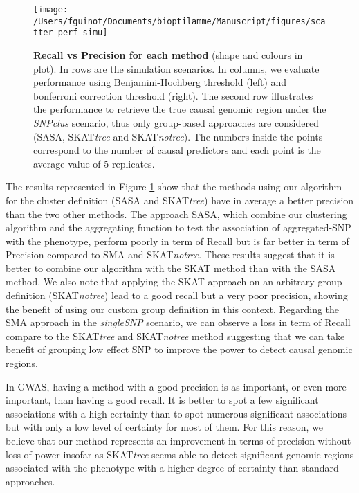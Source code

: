 \documentclass[]{book}
\begin{document}
\begin{figure}

{\centering \texttt{[image: /Users/fguinot/Documents/bioptilamme/Manuscript/figures/scatter\_perf\_simu]} 

}

\caption{\textbf{Recall vs Precision for each method} (shape and colours in plot). In rows are the simulation scenarios. In columns, we evaluate performance using Benjamini-Hochberg threshold (left) and bonferroni correction threshold (right). The second row illustrates the performance to retrieve the true causal genomic region under the \emph{SNPclus} scenario, thus only group-based approaches are considered (SASA, SKAT\emph{tree} and SKAT\emph{notree}). The numbers inside the points correspond to the number of causal predictors and each point is the average value of 5 replicates.}\label{fig:scatterperfsimu}
\end{figure}

The results represented in Figure \ref{fig:scatterperfsimu} show that
the methods using our algorithm for the cluster definition (SASA and
SKAT\emph{tree}) have in average a better precision than the two other
methods. The approach SASA, which combine our clustering algorithm and
the aggregating function to test the association of aggregated-SNP with
the phenotype, perform poorly in term of Recall but is far better in
term of Precision compared to SMA and SKAT\emph{notree}. These results
suggest that it is better to combine our algorithm with the SKAT method
than with the SASA method. We also note that applying the SKAT approach
on an arbitrary group definition (SKAT\emph{notree}) lead to a good recall
but a very poor precision, showing the benefit of using our custom group
definition in this context. Regarding the SMA approach in the
\emph{singleSNP} scenario, we can observe a loss in term of Recall compare to
the SKAT\emph{tree} and SKAT\emph{notree} method suggesting that we can take
benefit of grouping low effect SNP to improve the power to detect causal
genomic regions.

In GWAS, having a method with a good precision is as important, or even
more important, than having a good recall. It is better to spot a few
significant associations with a high certainty than to spot numerous
significant associations but with only a low level of certainty for most
of them. For this reason, we believe that our method represents an
improvement in terms of precision without loss of power insofar as
SKAT\emph{tree} seems able to detect significant genomic regions associated
with the phenotype with a higher degree of certainty than standard
approaches.
\end{document}
